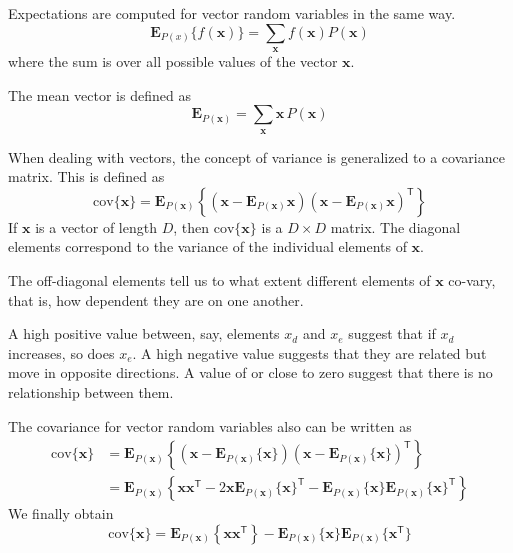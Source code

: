 \documentclass[a4paper,11pt]{article} %
\begin{document}
Expectations are computed for vector random variables in the same way.
\begin{equation}
\mathbf{E}_{P(x)}\{f(\mathbf{x})\} = \sum_{\mathbf{x}} f(\mathbf{x}) P(\mathbf{x})
\end{equation}
where the sum is over all possible values of the vector $\mathbf{x}$.

The mean vector is defined as
\begin{equation}
\mathbf{E}_{P(\mathbf{x})} = \sum_{\mathbf{x}} \mathbf{x}\,P(\mathbf{x})
\end{equation}

When dealing with vectors, the concept of variance is generalized to a covariance matrix.
This is defined as 
\begin{equation}
\mathrm{cov}\{\mathbf{x}\} = \mathbf{E}_{P(\mathbf{x})}\left\{
\left( \mathbf{x} - \mathbf{E}_{P(\mathbf{x})}{\mathbf{x}} \right)
\left( \mathbf{x} - \mathbf{E}_{P(\mathbf{x})}{\mathbf{x}} \right)^{\mathsf{T}}
\right\}
\end{equation}
If $\mathbf{x}$ is a vector of length $D$, then $\mathrm{cov}\{\mathbf{x}\}$
is a $D \times D$ matrix. The diagonal elements correspond to the variance of
the individual elements of $\mathbf{x}$.

The off-diagonal elements tell us to
what extent different elements of $\mathbf{x}$ co-vary, that is, how dependent
they are on one another.

A high positive value between, say, elements $x_d$ and $x_e$ suggest that if
$x_d$ increases, so does $x_e$. A high negative value suggests that they are
related but move in opposite directions.
A value of or close to zero suggest that there is no relationship between them.

The covariance for vector random variables also can be written as
\begin{align*}
\mathrm{cov}\{\mathbf{x}\} & = \mathbf{E}_{P(\mathbf{x})}\left\{
\left( \mathbf{x} - \mathbf{E}_{P(\mathbf{x})}\{\mathbf{x}\} \right)
\left( \mathbf{x} - \mathbf{E}_{P(\mathbf{x})}\{\mathbf{x}\} \right)^{\mathsf{T}}
\right\} \\
& = \mathbf{E}_{P(\mathbf{x})}\left\{
\mathbf{xx}^{\mathsf{T}} -
2\mathbf{x} \mathbf{E}_{P(\mathbf{x})}\{\mathbf{x}\}^{\mathsf{T}} - 
\mathbf{E}_{P(\mathbf{x})}\{\mathbf{x}\} \mathbf{E}_{P(\mathbf{x})}\{\mathbf{x}\}^{\mathsf{T}}
\right\}
\end{align*}
%
We finally obtain
\begin{equation}
\mathrm{cov}\{\mathbf{x}\} = \mathbf{E}_{P(\mathbf{x})}\left\{\mathbf{x}\mathbf{x}^{\mathsf{T}}
\right\}
- \mathbf{E}_{P(\mathbf{x})}\{\mathbf{x}\} \mathbf{E}_{P(\mathbf{x})}\{\mathbf{x}^{\mathsf{T}}\}
\end{equation}
\end{document}

